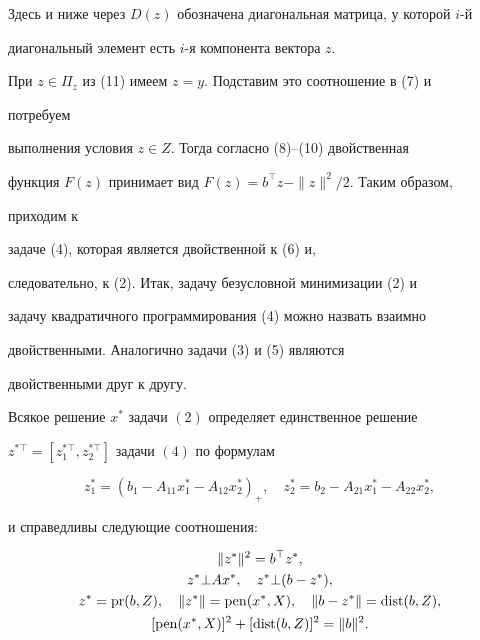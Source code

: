 Здесь и ниже через $D(z)$ обозначена диагональная матрица, у которой $i$-й


диагональный элемент есть $i$-я компонента вектора $z$.





При $z\in\Pi_z$ из (11) имеем $z=y$. Подставим это соотношение в (7) и 


потребуем


выполнения условия $z\in Z$. Тогда согласно (8)--(10) двойственная


функция $F(z)$ принимает вид $F(z)=b^\top z-\|z\|^2/2$. Таким образом, 


приходим к


задаче (4), которая является двойственной к (6) и,


следовательно, к (2). Итак, задачу безусловной минимизации (2) и


задачу квадратичного программирования (4) можно назвать взаимно


двойственными. Аналогично задачи (3) и (5) являются


двойственными друг к другу.





\begin{thm}


Всякое решение $x^*$ задачи $(2)$ определяет единственное решение


$z^{*\top}=[z^{*\top}_1,z^{*\top}_2]$ задачи $(4)$ по формулам


\begin{equation}


z^*_1=(b_1-A_{11}x^*_1-A_{12}x^*_2)_+,\quad


z^*_2=b_2-A_{21}x^*_1-A_{22}x^*_2,


\end{equation}


и справедливы следующие соотношения$:$


\begin{gather}


\|z^*\|^2=b^\top z^*,\\


z^*\bot Ax^*,\quad z^*\bot(b-z^*),\\


z^*=\pr(b,Z),\quad \|z^*\|=\pen(x^*,X),\quad


\|b-z^*\|=\dist(b,Z),\\


[\pen(x^*,X)]^2+[\dist(b,Z)]^2=\|b\|^2.


\end{gather}


\end{thm}






